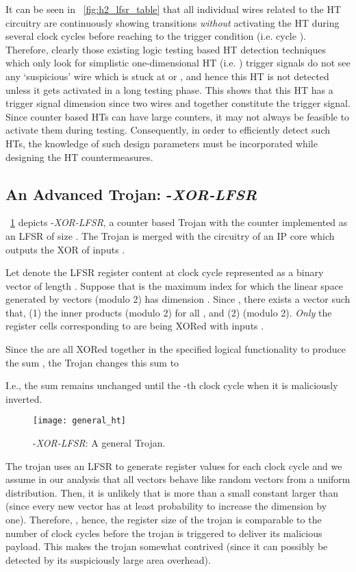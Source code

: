 \documentclass[10pt,journal,compsoc]{IEEEtran}
\begin{document}
It can be seen in \figurename~\ref{fig:h2_lfsr_table} that all individual wires related to the HT circuitry are continuously showing transitions \textit{without} activating the HT during several clock cycles before reaching to the trigger condition (i.e. cycle ).
Therefore, clearly those existing logic testing based HT detection techniques which only look for simplistic one-dimensional HT (i.e. ) trigger signals do not see any `suspicious' wire which is stuck at  or , and hence this HT is not detected unless it gets activated in a long testing phase. 
This shows that this HT has a trigger signal dimension  since two wires  and  together constitute the trigger signal.
Since counter based HTs can have large counters, it may not always be feasible to activate them during testing.
Consequently, in order to efficiently detect such HTs, the knowledge of such design parameters must be incorporated while designing the HT countermeasures.




\subsection{An Advanced  Trojan: -\textit{XOR-LFSR}}
\figurename~\ref{fig-htd} depicts -\textit{XOR-LFSR}, a counter based Trojan with the counter implemented as an LFSR 
of size . The Trojan is merged with the circuitry of an IP core which outputs the XOR of  inputs .

Let   denote the LFSR register content at clock cycle  represented as a binary vector of length . 
Suppose that  is the maximum index for which the linear space  generated by vectors  (modulo 2) has dimension . 
Since  , there exists a vector  such that, (1) the inner products  (modulo 2) for all , and (2)  (modulo 2). 
{\em Only} the register cells corresponding to  are being XORed with inputs . 


Since the  are all XORed together in the specified  logical functionality to produce the sum , the Trojan changes this sum to

I.e., the sum remains unchanged until the -th clock cycle when it is maliciously inverted.

\begin{figure}[!t]
\centering
\texttt{[image: general\_ht]}
\caption{-\textit{XOR-LFSR}: A general  Trojan.}
\label{fig-htd}
\end{figure}


The trojan uses an LFSR to generate register values  for each clock cycle  and we assume in our analysis  that all vectors  behave like random vectors from a uniform distribution. 
Then, it is unlikely that  is more than a small constant larger than  (since every new vector  has at least probability  to increase the dimension by one). 
Therefore, , hence, the register size of the trojan is comparable to the number of clock cycles before the trojan is triggered to deliver its malicious payload. 
This makes the trojan somewhat contrived (since it can possibly be detected by its suspiciously large area overhead). 
\end{document}
